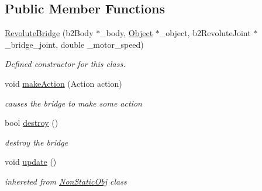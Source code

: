 \subsection*{Public Member Functions}
\begin{DoxyCompactItemize}
\item 
\hyperlink{class_revolute_bridge_a2b0f68222d155f93018b85bd5629c4b4}{Revolute\+Bridge} (b2\+Body $\ast$\+\_\+body, \hyperlink{class_object}{Object} $\ast$\+\_\+object, b2\+Revolute\+Joint $\ast$\+\_\+bridge\+\_\+joint, double \+\_\+motor\+\_\+speed)
\begin{DoxyCompactList}\small\item\em Defined constructor for this class. \end{DoxyCompactList}\item 
void \hyperlink{class_revolute_bridge_aad7a57a94ab4bd41cd4e1da48d627d00}{make\+Action} (Action action)
\begin{DoxyCompactList}\small\item\em causes the bridge to make some action \end{DoxyCompactList}\item 
\mbox{\label{class_revolute_bridge_ae3777840011c40e126e6e3fce4706f9a}} 
bool \hyperlink{class_revolute_bridge_ae3777840011c40e126e6e3fce4706f9a}{destroy} ()
\begin{DoxyCompactList}\small\item\em destroy the bridge \end{DoxyCompactList}\item 
\mbox{\label{class_revolute_bridge_ac462a7308f806d30c53e35b2b8a57e5d}} 
void \hyperlink{class_revolute_bridge_ac462a7308f806d30c53e35b2b8a57e5d}{update} ()
\begin{DoxyCompactList}\small\item\em inhereted from \hyperlink{class_non_static_obj}{Non\+Static\+Obj} class \end{DoxyCompactList}\end{DoxyCompactItemize}
